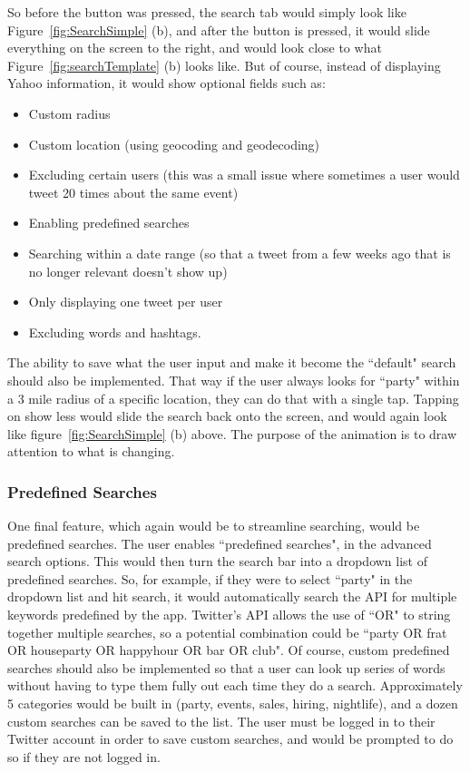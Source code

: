 \documentclass[11pt]{article}
\begin{document}
So before the button was pressed, the search tab would simply look like Figure~\ref{fig:SearchSimple} (b), and after the button is pressed, it would slide everything on the screen to the right, and would look close to what Figure~\ref{fig:searchTemplate} (b) looks like. But of course, instead of displaying Yahoo information, it would show optional fields such as: 

\begin{itemize}
\item Custom radius
\item Custom location (using geocoding and geodecoding)
\item Excluding certain users (this was a small issue where sometimes a user would tweet 20 times about the same event) 
\item Enabling predefined searches
\item Searching within a date range (so that a tweet from a few weeks ago that is no longer relevant doesn't show up)
\item Only displaying one tweet per user
\item Excluding words and hashtags. 
\end{itemize}

The ability to save what the user input and make it become the ``default" search should also be implemented. That way if the user always looks for ``party" within a 3 mile radius of a specific location, they can do that with a single tap. Tapping on show less would slide the search back onto the screen, and would again look like figure~\ref{fig:SearchSimple} (b) above. The purpose of the animation is to draw attention to what is changing. 

\subsubsection{Predefined Searches}

One final feature, which again would be to streamline searching, would be predefined searches. The user enables ``predefined searches", in the advanced search options. This would then turn the search bar into a dropdown list of predefined searches. So, for example, if they were to select ``party" in the dropdown list and hit search, it would automatically search the API for multiple keywords predefined by the app. Twitter's API allows the use of ``OR" to string together multiple searches, so a potential combination could be ``party OR frat OR houseparty OR happyhour OR bar OR club". Of course, custom predefined searches should also be implemented so that a user can look up series of words without having to type them fully out each time they do a search. Approximately 5 categories would be built in (party, events, sales, hiring, nightlife), and a dozen custom searches can be saved to the list. The user must be logged in to their Twitter account in order to save custom searches, and would be prompted to do so if they are not logged in.
\end{document}
